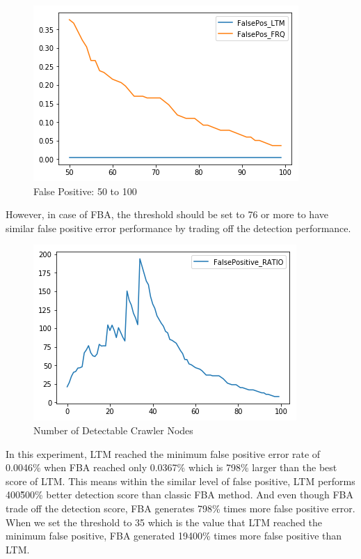 \documentclass[sigconf,anonymous=true]{acmart}
\begin{document}
\begin{figure}[H]
    \centering
    \includegraphics[width=0.85\columnwidth]{figs/figure_fp_compare_02.png}
    \caption{False Positive: 50 to 100}
    \label{fig:my_label}
\end{figure}

 However, in case of FBA, the threshold should be set to 76 or more to have similar false positive error performance by trading off the detection performance.\\

\begin{figure}[H]
    \centering
    \includegraphics[width=0.85\columnwidth]{figs/figure_fp_ratio.png}
    \caption{Number of Detectable Crawler Nodes}
    \label{fig:my_label}
\end{figure}

In this experiment, LTM reached the minimum false positive error rate of 0.0046\% when FBA reached only 0.0367\% which is 798\% larger than the best score of LTM. This means within the similar level of false positive, LTM performs 400\~500\% better detection score than classic FBA method. And even though FBA trade off the detection score, FBA generates 798\% times more false positive error. When we set the threshold to 35 which is the value that LTM reached the minimum false positive, FBA generated 19400\% times more false positive than LTM.
\end{document}
